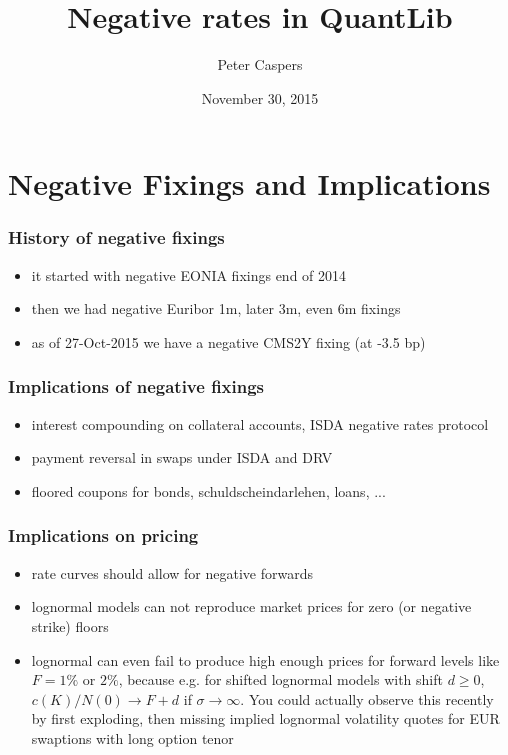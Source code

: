 \documentclass{beamer}
\begin{document}
\title{Negative rates in QuantLib}
\author{Peter Caspers}
\date{November 30, 2015}

\frame{\titlepage}


\section{Negative Fixings and Implications}

\begin{frame}[fragile]
\frametitle{History of negative fixings}
\begin{itemize}
\item it started with negative EONIA fixings end of 2014
\item then we had negative Euribor 1m, later 3m, even 6m fixings
\item as of 27-Oct-2015 we have a negative CMS2Y fixing (at -3.5 bp)
\end{itemize}
\end{frame}

\begin{frame}[fragile]
\frametitle{Implications of negative fixings}
\begin{itemize}
\item interest compounding on collateral accounts, ISDA negative rates protocol
\item payment reversal in swaps under ISDA and DRV
\item floored coupons for bonds, schuldscheindarlehen, loans, ...
\end{itemize}
\end{frame}

\begin{frame}[fragile]
\frametitle{Implications on pricing}
\begin{itemize}
\item rate curves should allow for negative forwards
\item lognormal models can not reproduce market prices for zero (or negative strike) floors
\item lognormal can even fail to produce high enough prices for forward levels like $F=1\%$ or $2\%$, because e.g. for shifted lognormal models with shift $d\geq0$, $c(K)/N(0)\rightarrow F+d$ if $\sigma\rightarrow\infty$. You could actually observe this recently by first exploding, then missing implied lognormal volatility quotes for EUR swaptions with long option tenor
\end{itemize}
\end{frame}
\end{document}
